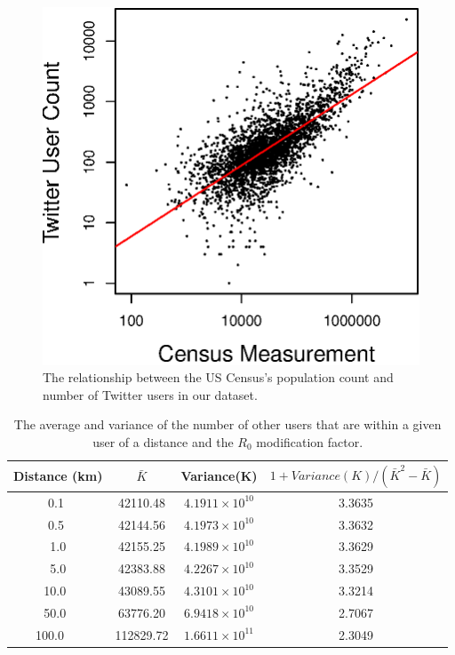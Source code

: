 \begin{figure}
\centering
\includegraphics[width=.5\textwidth]{longitude/figs/compare_twitter_census.eps}
\caption{The relationship between the US Census's population count and number of Twitter users in our dataset.}
\label{fig:census}
\end{figure}

\begin{table}[h]
\centering
\begin{tabular}{cccc}
Distance (km) & \(\bar{K}\) & Variance(K) & \(1+Variance(K)/(\bar{K}^2-\bar{K})\) \\ \midrule
~~0.1      ~~    &     42110.48     &    \(  4.1911\times10^{10}\)     &     3.3635     \\ 
\rowcolor{lightblue}  ~~0.5      ~~   &      42144.56     &     \(4.1973  \times10^{10}\)     &     3.3632 \\ 
~~ 1.0   ~~       &      42155.25     &     \( 4.1989  \times10^{10}\)    &     3.3629     \\
\rowcolor{lightblue} ~~ 5.0   ~~      &      42383.88     &      \( 4.2267 \times10^{10}\)    &       3.3529    \\ 
~ 10.0      ~~    &       43089.55    &     \( 4.3101\times10^{10}\)      &    3.3214       \\ 
\rowcolor{lightblue} ~ 50.0   ~~      &       63776.20    &      \(6.9418  \times10^{10}\)    &        2.7067   \\ 
100.0  ~~        &       112829.72    &      \( 1.6611  \times10^{11}\)   &      2.3049     \\ 
\end{tabular}
\captionsetup{singlelinecheck=off}
\caption[The average and variance of the number of other users that are within a given user of a distance and the R0 modification factor.]{The average and variance of the number of other users that are within a given user of a distance and the \(R_0\) modification factor.}
\label{tab:ro_adjustment}
\end{table}


